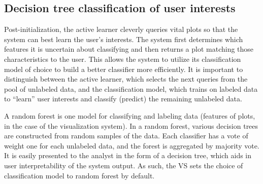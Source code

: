 \subsection{Decision tree classification of user interests}
\label{sec:visualizer:al:tree}

Post-initialization, the active learner cleverly queries vital plots so that 
the system can best learn the user’s interests. The system first determines 
which features it is uncertain about classifying and then returns a plot 
matching those characteristics to the user. This allows the system to utilize 
its classification model of choice to build a better classifier more 
efficiently. It is important to distinguish between the active learner, which 
selects the next queries from the pool of unlabeled data, and the
classification model, which trains on labeled data to ``learn'' user interests 
and classify (predict) the remaining unlabeled data. 

A random forest is one model for classifying and labeling data (features of 
plots, in the case of the visualization system). In a random forest, various 
decision trees are constructed from random samples of the data. Each classifier 
has a vote of weight one for each unlabeled data, and the forest is aggregated 
by majority vote. It is easily presented to the 
analyst in the form of a decision tree, which aids in user 
interpretability of the system output. As such, the VS sets the choice of 
classification model to random forest by default.
